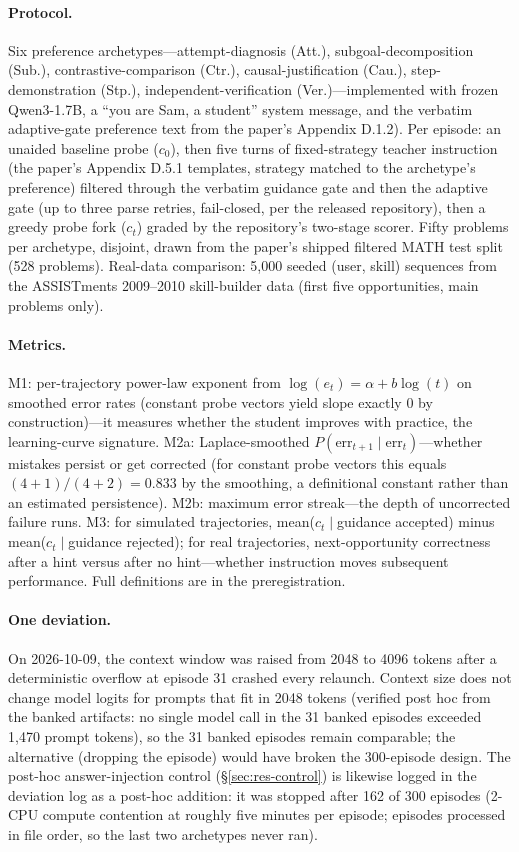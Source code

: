 \documentclass[notitlepage,12pt]{jedm}
\begin{document}
\paragraph{Protocol.} Six preference archetypes---attempt-diagnosis (Att.),
subgoal-decomposition (Sub.), contrastive-comparison (Ctr.),
causal-justification (Cau.), step-demonstration (Stp.),
independent-verification (Ver.)---implemented with frozen Qwen3-1.7B, a
``you are Sam, a student'' system message, and the verbatim adaptive-gate
preference text from the paper's Appendix D.1.2). Per episode: an unaided
baseline probe ($c_0$), then five turns of fixed-strategy teacher instruction
(the paper's Appendix D.5.1 templates, strategy matched to the archetype's
preference) filtered through the verbatim guidance gate and then the
adaptive gate (up to three parse retries, fail-closed, per the released
repository), then a greedy probe fork ($c_t$) graded by the repository's
two-stage scorer. Fifty problems per archetype, disjoint, drawn from the
paper's shipped filtered MATH test split (528 problems). Real-data
comparison: 5{,}000 seeded (user, skill) sequences from the ASSISTments
2009--2010 skill-builder data (first five opportunities, main problems
only).

\paragraph{Metrics.} M1: per-trajectory power-law exponent from
$\log(e_t)=\alpha+b\log(t)$ on smoothed error rates (constant probe vectors
yield slope exactly 0 by construction)---it measures whether the student
improves with practice, the learning-curve signature. M2a:
Laplace-smoothed $P(\text{err}_{t+1}\mid\text{err}_t)$---whether mistakes
persist or get corrected (for constant probe vectors this equals
$(4+1)/(4+2)=0.833$ by the smoothing, a definitional constant rather than
an estimated persistence). M2b: maximum error streak---the depth of
uncorrected failure runs. M3: for simulated trajectories, mean($c_t\mid$guidance accepted) minus
mean($c_t\mid$guidance rejected); for real trajectories, next-opportunity
correctness after
a hint versus after no hint---whether instruction moves subsequent
performance. Full definitions are in the preregistration.

\paragraph{One deviation.} On 2026-10-09, the context window was raised from
2048 to 4096 tokens after a deterministic overflow at episode 31 crashed
every relaunch. Context size does not change model logits for prompts that
fit in 2048 tokens (verified post hoc from the banked artifacts: no single
model call in the 31 banked episodes exceeded 1{,}470 prompt tokens), so the 31 banked episodes remain comparable; the
alternative (dropping the episode) would have broken the 300-episode design.
The post-hoc answer-injection control (\S\ref{sec:res-control}) is likewise
logged in the deviation log as a post-hoc addition: it was stopped after
162 of 300 episodes (2-CPU compute contention at roughly five minutes per
episode; episodes processed in file order, so the last two archetypes never
ran).
\end{document}
